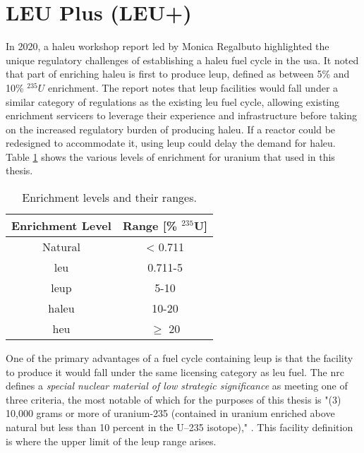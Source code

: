 \section{LEU Plus (LEU+)}
\label{sec:leup}

In 2020, a \gls{haleu} workshop report led by Monica Regalbuto \cite{regalbuto_high_assay_2020} highlighted the unique regulatory challenges of establishing a \gls{haleu} fuel cycle in the \gls{usa}. It noted that part of enriching \gls{haleu} is first to produce \gls{leup}, defined as between 5\% and 10\% $^{235}U$ enrichment. The report notes that \gls{leup} facilities would fall under a similar category of regulations as the existing \gls{leu} fuel cycle, allowing existing enrichment servicers to leverage their experience and infrastructure before taking on the increased regulatory burden of producing \gls{haleu}. If a reactor could be redesigned to accommodate it, using \gls{leup} could delay the demand for \gls{haleu}. Table \ref{tab:enrichment_levels} shows the various levels of enrichment for uranium that used in this thesis.

\begin{table}[H]
   \centering
   \caption{Enrichment levels and their ranges.}
   \label{tab:enrichment_levels}
   \begin{tabular}{c c}
      \hline
      \textbf{Enrichment Level} & \textbf{Range [\%  $^{235}$U]} \\
      \hline
      Natural & < 0.711 \\
      \gls{leu} & 0.711-5 \\
      \gls{leup} & 5-10 \\
      \gls{haleu} & 10-20 \\
      \gls{heu} & $\geq$ 20  \\
      \hline
   \end{tabular}
\end{table}

One of the primary advantages of a fuel cycle containing \gls{leup} is that the facility to produce it would fall under the same licensing category as \gls{leu} fuel. The \gls{nrc} defines a \textit{special nuclear material of low strategic significance} as meeting one of three criteria, the most notable of which for the purposes of this thesis is "(3) 10,000 grams or more of uranium-235 (contained in uranium enriched above natural but less than 10 percent in the U–235 isotope)," \cite{nrc_catiii}. This facility definition is where the upper limit of the \gls{leup} range arises.

